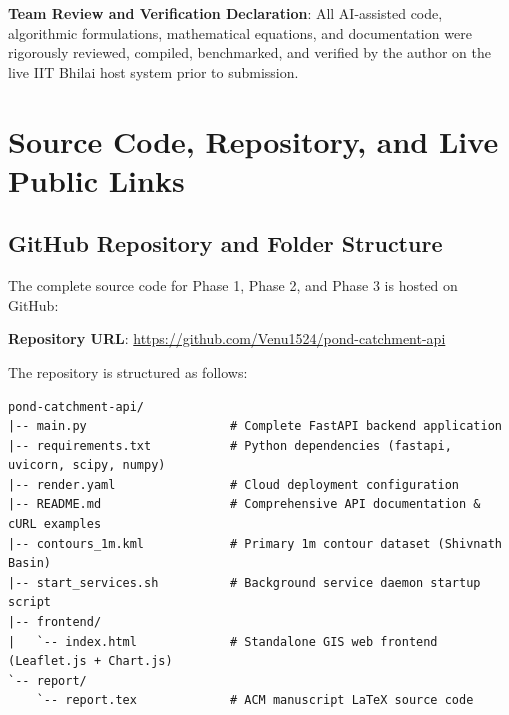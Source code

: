 \documentclass[manuscript,screen,nonacm]{acmart}
\begin{document}
\noindent \textbf{Team Review and Verification Declaration}: All AI-assisted code, algorithmic formulations, mathematical equations, and documentation were rigorously reviewed, compiled, benchmarked, and verified by the author on the live IIT Bhilai host system prior to submission.

\appendix

\section{Source Code, Repository, and Live Public Links}
\label{sec:appendix}

\subsection{GitHub Repository and Folder Structure}
The complete source code for Phase 1, Phase 2, and Phase 3 is hosted on GitHub:
\begin{center}
\textbf{Repository URL}: \url{https://github.com/Venu1524/pond-catchment-api}
\end{center}

\noindent The repository is structured as follows:
\begin{verbatim}
pond-catchment-api/
|-- main.py                    # Complete FastAPI backend application
|-- requirements.txt           # Python dependencies (fastapi, uvicorn, scipy, numpy)
|-- render.yaml                # Cloud deployment configuration
|-- README.md                  # Comprehensive API documentation & cURL examples
|-- contours_1m.kml            # Primary 1m contour dataset (Shivnath Basin)
|-- start_services.sh          # Background service daemon startup script
|-- frontend/
|   `-- index.html             # Standalone GIS web frontend (Leaflet.js + Chart.js)
`-- report/
    `-- report.tex             # ACM manuscript LaTeX source code
\end{verbatim}
\end{document}

